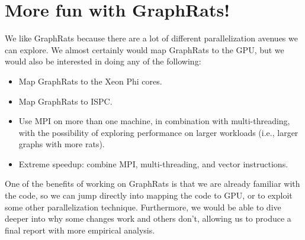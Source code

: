 \documentclass[11pt]{article}
\begin{document}
\section*{More fun with GraphRats!}

We like GraphRats because there are a lot of different parallelization avenues
we can explore. We almost certainly would map GraphRats to the GPU, but we would
also be interested in doing any of the following:

\begin{itemize}
\item
Map GraphRats to the Xeon Phi cores.
\item
Map GraphRats to ISPC.
\item
Use MPI on more than one machine, in combination with multi-threading, with the
possibility of exploring performance on larger workloads (i.e., larger graphs
with more rats).
\item Extreme speedup: combine MPI, multi-threading, and vector instructions.
\end{itemize}

One of the benefits of working on GraphRats is that we are already familiar with
the code, so we can jump directly into mapping the code to GPU, or to exploit
some other parallelization technique. Furthermore, we would be able to dive
deeper into why some changes work and others don't, allowing us to produce a
final report with more empirical analysis.

%
\printbibliography
\end{document}
